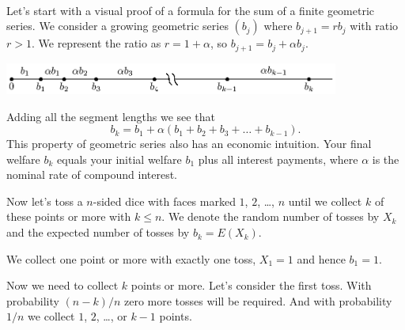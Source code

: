 \documentclass{article}
\theoremstyle{plain}
\begin{document}
\begin{filler}
[white]
\\


\noindent Let's start with a visual proof of a formula for the sum of a  finite geometric series.
We consider a growing geometric series $(b_j)$ where $b_{j + 1} = r b_j$ with ratio $r > 1$.
We represent the ratio as $r = 1 + \alpha$, so $b_{j + 1} = b_j + \alpha b_j$.

\includegraphics[width=11cm]{geometric_series.eps}


% 
% 
		

Adding all the segment lengths we see that
\[
b_{k} = b_1 + \alpha (b_1 + b_2 + b_3 + \ldots + b_{k-1}).
\]
This property of geometric series also has an economic intuition. 
Your final welfare $b_k$ equals your initial welfare $b_1$ plus all interest payments,
where $\alpha$ is the nominal rate of compound interest.


Now let's toss a $n$-sided dice with faces marked $1$, $2$, \ldots, $n$ 
until we collect $k$ of these points or more with $k\leq n$.
We denote the random number of tosses by $X_k$ and the expected number of tosses 
by $b_k = E(X_k)$. 

We collect one point or more with exactly one toss, $X_1 = 1$ and hence $b_1 = 1$. 

Now we need to collect $k$ points or more. Let's consider the first toss.
With probability $(n - k)/n$ zero more tosses will be required. 
And with probability $1/n$ we collect $1$, $2$, \ldots, or $k-1$ points.


\end{filler}
\end{document}
